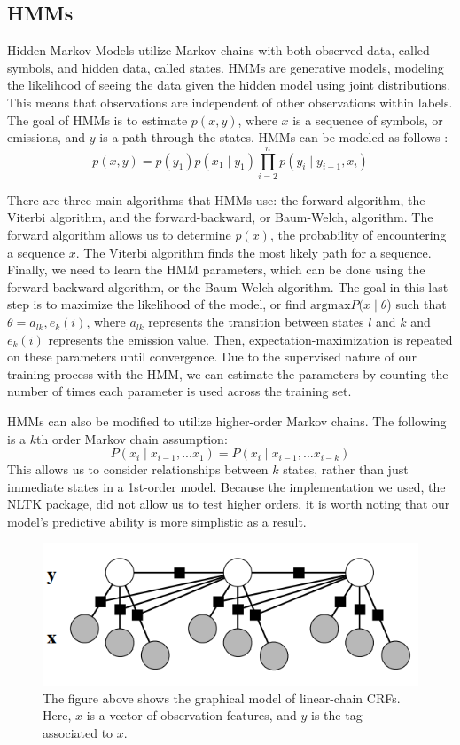 \documentclass[11 pt, twocolumn]{article}
\begin{document}
\subsection{HMMs}
Hidden Markov Models utilize Markov chains with both observed data, called symbols, and hidden data, called states. HMMs are generative models, modeling the likelihood of seeing the data given the hidden model using joint distributions. This means that observations are independent of other observations within labels. The goal of HMMs is to estimate $p(x, y)$, where $x$ is a sequence of symbols, or emissions, and $y$ is a path through the states. HMMs can be modeled as follows \cite{Lukov}:
$$ p(x,y) = p(y_1)p(x_1\mid y_1) \prod_{i=2}^{n} p(y_i \mid y_{i-1}, x_i)$$

There are three main algorithms that HMMs use: the forward algorithm, the Viterbi algorithm, and the forward-backward, or Baum-Welch, algorithm. The forward algorithm allows us to determine $p(x)$, the probability of encountering a sequence $x$. The Viterbi algorithm finds the most likely path for a sequence. Finally, we need to learn the HMM parameters, which can be done using the forward-backward algorithm, or the Baum-Welch algorithm. The goal in this last step is to maximize the likelihood of the model, or find $\text{argmax} P(x\mid \theta$) such that $\theta = {a_{lk}, e_k(i)}$, where $a_{lk}$ represents the transition between states $l$ and $k$ and $e_k(i)$ represents the emission value. Then, expectation-maximization is repeated on these parameters until convergence. Due to the supervised nature of our training process with the HMM, we can estimate the parameters by counting the number of times each parameter is used across the training set.

HMMs can also be modified to utilize higher-order Markov chains. The following is a $k$th order Markov chain assumption: 
$$P(x_i \mid x_{i-1} , ... x_1) = P(x_i \mid x_{i-1},...x_{i-k})$$ 
This allows us to consider relationships between
$k$ states, rather than just immediate states in a 1st-order model. Because the implementation we used, the NLTK package, did not allow us to test higher orders, it is worth noting that our model's predictive ability is more simplistic as a result.

\begin{figure}
\includegraphics[width = .5\textwidth]{LinearChainCRFGraph.png}
\caption{The figure above shows the graphical model of linear-chain CRFs. Here, $x$ is a vector of observation features, and $y$ is the tag associated to $x$.}
\label{fig:linearchainCRFGraph}
\end{figure}
\end{document}
